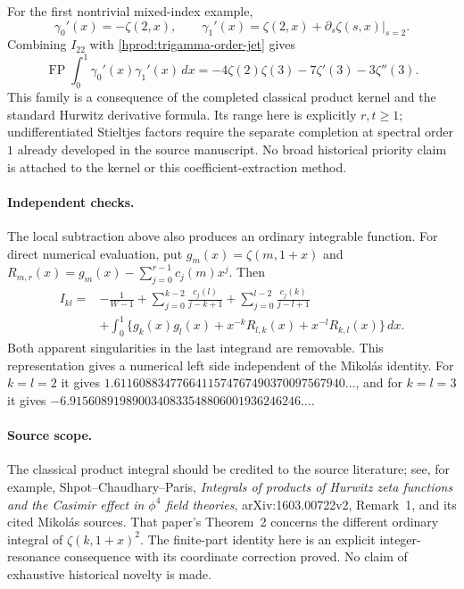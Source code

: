 For the first nontrivial mixed-index example,
\[
 \gamma_0'(x)=-\zeta(2,x),\qquad
 \gamma_1'(x)=\zeta(2,x)+
       \left.\partial_s\zeta(s,x)\right|_{s=2}.
\]
Combining $I_{22}$ with \eqref{hprod:trigamma-order-jet} gives
\begin{equation}\label{hprod:stieltjes-first-example}
 \boxed{\operatorname{FP}\int_0^1
         \gamma_0'(x)\gamma_1'(x)\,dx
 =-4\zeta(2)\zeta(3)-7\zeta'(3)-3\zeta''(3).}
\end{equation}
This family is a consequence of the completed classical product kernel
and the standard Hurwitz derivative formula.  Its range here is
explicitly $r,t\ge1$; undifferentiated Stieltjes factors require the
separate completion at spectral order $1$ already developed in the
source manuscript.  No broad historical priority claim is attached to
the kernel or this coefficient-extraction method.

\paragraph{Independent checks.}
The local subtraction above also produces an ordinary integrable
function.  For direct numerical evaluation, put
$g_m(x)=\zeta(m,1+x)$ and
$R_{m,r}(x)=g_m(x)-\sum_{j=0}^{r-1}c_j(m)x^j$.  Then
\begin{align*}
 I_{kl}={}&-\frac1{W-1}
 +\sum_{j=0}^{k-2}\frac{c_j(l)}{j-k+1}
 +\sum_{j=0}^{l-2}\frac{c_j(k)}{j-l+1}\\
 &+\int_0^1\{g_k(x)g_l(x)+x^{-k}R_{l,k}(x)
                                +x^{-l}R_{k,l}(x)\}\,dx.
\end{align*}
Both apparent singularities in the last integrand are removable.  This
representation gives a numerical left side independent of the
Mikol\'as identity.  For $k=l=2$ it gives
$1.6116088347766411574767490370097567940\ldots$, and for
$k=l=3$ it gives
$-6.9156089198900340833548806001936246246\ldots$.

\paragraph{Source scope.}
The classical product integral should be credited to the source
literature; see, for example, Shpot--Chaudhary--Paris,
\emph{Integrals of products of Hurwitz zeta functions and the Casimir
effect in $\phi^4$ field theories}, arXiv:1603.00722v2, Remark~1,
and its cited Mikol\'as sources.  That paper's Theorem~2 concerns the
different ordinary integral of $\zeta(k,1+x)^2$.  The finite-part
identity here is an explicit integer-resonance consequence with its
coordinate correction proved.  No claim of exhaustive historical
novelty is made.
